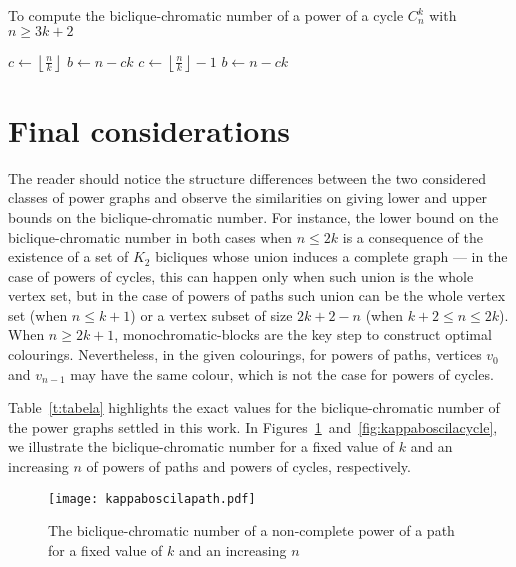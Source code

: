 \documentclass{article}
\begin{document}
	\begin{algorithm}[t]
	\label{alg:numerobicliquecromaticopowerofcycle}
	\caption{To compute the biclique-chromatic number of a power of a cycle $C_n^k$
	with $n \geq 3k + 2$}
	\BlankLine
	\Begin
	{	
		$c \longleftarrow \left\lfloor \frac{n}{k} \right\rfloor$\;
		$b \longleftarrow n - ck$\;
		{
		}
		{
			$c \longleftarrow \left\lfloor \frac{n}{k} \right\rfloor - 1$\;
			$b \longleftarrow n - ck$\;
			{
			}
			{
			}
		}
	}
	\end{algorithm}

\section{Final considerations}
\label{sec:final}

The reader should notice the structure differences between the two
considered classes of power graphs and observe the similarities on giving lower
and upper bounds on the biclique-chromatic number. For instance,
the lower bound on the biclique-chromatic number in both cases when $n \leq 2k$ 
is a consequence of the existence of a set of $K_2$ bicliques whose union
induces a complete graph --- in the case of powers of cycles, this can happen
only when such union is the whole vertex set, but in the case of powers of
paths such union can be the whole vertex set (when $n \leq k + 1$) or a
vertex subset of size $2k + 2 - n$ (when $k + 2 \leq n \leq 2k$). When $n \geq
2k + 1$, monochromatic-blocks are the key step to construct optimal colourings. 
Nevertheless, in the given colourings, for powers of
paths, vertices $v_0$ and $v_{n-1}$ may have the same colour, which is not the
case for powers of cycles.

Table~\ref{t:tabela} highlights the exact values for the biclique-chromatic
number of the power graphs settled in this work. In
Figures~\ref{fig:kappaboscilapath}~and~\ref{fig:kappaboscilacycle}, we illustrate
the biclique-chromatic number for a fixed value of $k$ and an increasing $n$ of
powers of paths and powers of cycles, respectively.

\begin{figure}[t]
\centering
	\texttt{[image: kappaboscilapath.pdf]}
	\caption{The biclique-chromatic number of a non-complete power of a path for a fixed value of
	$k$ and an increasing $n$}
	\label{fig:kappaboscilapath}
\end{figure}
\end{document}

